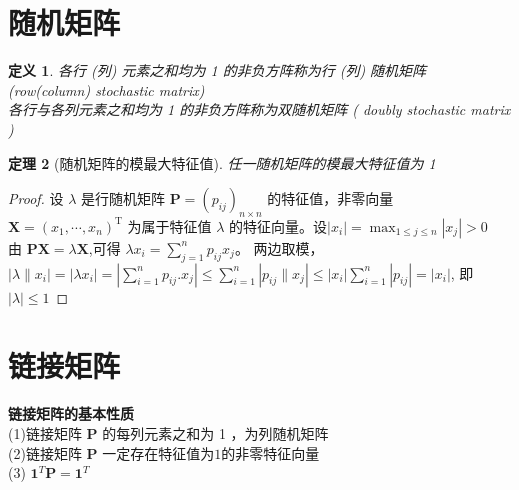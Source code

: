 \documentclass[12pt, a4paper, oneside]{ctexbook}
\newtheorem{theorem}{定理}[section]
\newtheorem{definition}[theorem]{定义}
\begin{document}
\section{随机矩阵}
\begin{definition}
\noindent 各行 (列) 元素之和均为 1 的非负方阵称为行 (列) 随机矩阵 (row(column) stochastic matrix)\\
各行与各列元素之和均为 1 的非负方阵称为双随机矩阵 ( doubly stochastic matrix )
\end{definition}
\begin{theorem}[随机矩阵的模最大特征值]
    任一随机矩阵的模最大特征值为 1   
\end{theorem}
\begin{proof}
    设 $\lambda$ 是行随机矩阵 $\mathbf{P}=(p_{ij})_{n\times n}$ 的特征值，非零向量 $\mathbf{X} = ( x_1, \cdots , x_n) ^{\mathrm{T} }$ 为属于特征值 $\lambda$ 的特征向量。设$|x_i|=\max_{1\leq j\leq n}|x_j|>0$\\
    由 $\mathbf{PX}=\lambda\mathbf{X}$,可得 $\lambda x_i=\sum_{j=1}^np_{ij}x_j$。 两边取模，$|\lambda\|x_i|=|\lambda x_i|=\left|\sum_{i=1}^np_{ij}.x_j\right|\leq\sum_{i=1}^n|p_{ij}\|x_j|\leq|x_i|\sum_{i=1}^n|p_{ij}|=|x_i|$, 即$|\lambda|\leq1$
\end{proof}
\section{链接矩阵}
\noindent\textbf{链接矩阵的基本性质}\\
(1)链接矩阵 $\mathbf{P}$ 的每列元素之和为 1 ，为列随机矩阵\\
(2)链接矩阵 $\mathbf{P}$ 一定存在特征值为$1$的非零特征向量\\
(3)  $\mathbf{1}^T \mathbf{P} = \mathbf{1}^T$
\end{document}
